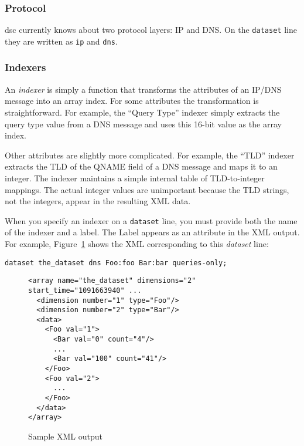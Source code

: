 \documentclass{report}
\def\dsc{{\sc dsc}}
\begin{document}
\subsubsection{Protocol}

{\dsc} currently knows about two protocol layers: IP and DNS.
On the {\tt dataset\/} line they are written as {\tt ip\/} and {\tt dns\/}.

\subsubsection{Indexers}

An {\em indexer\/} is simply a function that transforms the attributes
of an IP/DNS message into an array index.  For some attributes the
transformation is straightforward.  For example, the ``Query Type''
indexer simply extracts the query type value from a DNS message and
uses this 16-bit value as the array index.

Other attributes are slightly more complicated.  For example, the
``TLD'' indexer extracts the TLD of the QNAME field of a DNS message
and maps it to an integer.  The indexer maintains a simple internal
table of TLD-to-integer mappings.  The actual integer values are
unimportant because the TLD strings, not the integers, appear in
the resulting XML data.

When you specify an indexer on a {\tt dataset\/} line, you must
provide both the name of the indexer and a label.  The Label appears
as an attribute in the XML output.  For example,
Figure~\ref{fig-sample-xml} shows the XML corresponding to this
{\em dataset\/} line:

\begin{verbatim}
dataset the_dataset dns Foo:foo Bar:bar queries-only;
\end{verbatim}

\begin{figure}
\begin{small}\begin{verbatim}
<array name="the_dataset" dimensions="2" start_time="1091663940" ...
  <dimension number="1" type="Foo"/>
  <dimension number="2" type="Bar"/>
  <data>
    <Foo val="1">
      <Bar val="0" count="4"/>
      ...
      <Bar val="100" count="41"/>
    </Foo>
    <Foo val="2">
      ...
    </Foo>
  </data>
</array>
\end{verbatim}\end{small}
\label{fig-sample-xml}
\caption{Sample XML output}
\end{figure}
\end{document}
